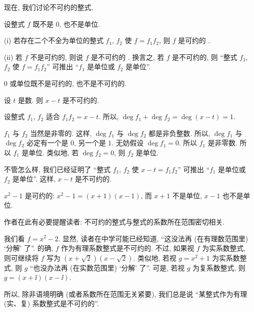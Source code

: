 现在, 我们讨论不可约的整式.

\begin{definition}
    设整式 $f$ 既不是 $0$, 也不是单位.

    (i) 若存在二个不全为单位的整式 $f_1$, $f_2$ 使 $f = f_1 f_2$, 则 $f$ 是可约的 .

    (ii) 若 $f$ 不是可约的, 则说 $f$ 是不可约的 . 换言之, 若 $f$ 是不可约的, 则 ``整式 $f_1$, $f_2$ 使 $f = f_1 f_2$'' 可推出 ``$f_1$ 是单位或 $f_2$ 是单位''.
\end{definition}

\begin{remark}
    $0$ 或单位既不是可约的, 也不是不可约的.
\end{remark}

\begin{example}
    设 $t$ 是数. 则 $x-t$ 是不可约的.

    设整式 $f_1$, $f_2$ 适合 $f_1 f_2 = x-t$. 所以, $\deg f_1 + \deg f_2 = \deg {(x-t)} = 1$.

    $f_1$ 与 $f_2$ 当然是非零的. 这样, $\deg f_1$ 与 $\deg f_2$ 都是非负整数. 所以, $\deg f_1$ 与 $\deg f_2$ 必定有一个是 $0$, 另一个是 $1$. 无妨假设 $\deg f_1 = 0$. 所以 $f_1$ 是非零数. 所以 $f_1$ 是单位. 类似地, 若 $\deg f_2 = 0$, 则 $f_2$ 是单位.

    不管怎么样, 我们已经证明了 ``整式 $f_1$, $f_2$ 使 $x-t = f_1 f_2$'' 可推出 ``$f_1$ 是单位或 $f_2$ 是单位''. 这样, $x-t$ 是不可约的.
\end{example}

\begin{example}
    $x^2 - 1$ 是可约的: $x^2 - 1 = (x+1) (x-1)$, 而 $x+1$ 不是单位, $x-1$ 也不是单位.
\end{example}

\begin{remark}
    作者在此有必要提醒读者: 不可约的整式与整式的系数所在范围密切相关.

    我们看 $f = x^2 - 2$. 显然, 读者在中学可能已经知道, ``这没法再 (在有理数范围里) `分解' 了''. 的确, $f$ 作为有理系数整式是不可约的. 不过, 如果视 $f$ 为实系数整式, 则可继续将 $f$ 写为 $(x + \sqrt2) (x - \sqrt2)$. 类似地, 若视 $g = x^2 + 1$ 为实系数整式, 则 $g$ ``也没办法再 (在实数范围里) `分解' 了''. 可是, 若视 $g$ 为复系数整式, 则 $g = (x + \ii) (x - \ii)$.

    所以, 除非语境明确 (或者系数所在范围无关紧要), 我们总是说 ``某整式作为有理 (实、复) 系数整式是不可约的''.
\end{remark}

